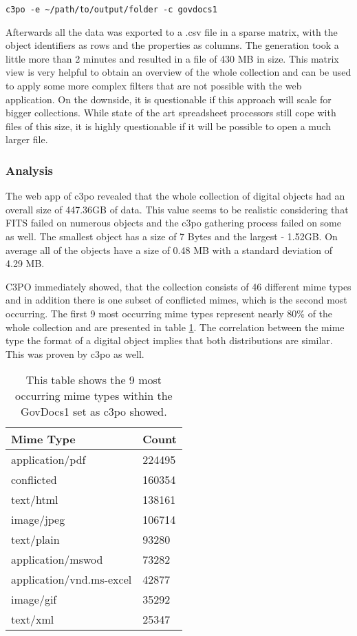 \begin{verbatim}
c3po -e ~/path/to/output/folder -c govdocs1
\end{verbatim}
Afterwards all the data was exported to a .csv file in a sparse matrix, with the object identifiers as rows and the properties as columns. The generation took a little more than 2 minutes and resulted in a file of 430 MB in size. This matrix view is very helpful to obtain an overview of the whole collection and can be used to apply some more complex filters that are not possible with the web application. On the downside, it is questionable if this approach will scale for bigger collections. While state of the art spreadsheet processors still cope with files of this size, it is highly questionable if it will be possible to open a much larger file.

\subsubsection{Analysis}
The web app of c3po revealed that the whole collection of digital objects had an overall size of 447.36GB of data. This value seems to be realistic considering that FITS failed on numerous objects and the c3po gathering process failed on some as well. The smallest object has a size of 7 Bytes and the largest - 1.52GB. On average all of the objects have a size of 0.48 MB with a standard deviation of 4.29 MB.

C3PO immediately showed, that the collection consists of 46 different mime types and in addition there is one subset of conflicted mimes, which is the second most occurring. The first 9 most occurring mime types represent nearly 80\% of the whole collection and are presented in table \ref{tab:govdocs1_mimetypes}. The correlation between the mime type the format of a digital object implies that both distributions are similar. This was proven by c3po as well.


\begin{table}[h]
\centering
\begin{tabular}{l || l }
\hline
Mime Type & Count \\
\hline
\hline
 application/pdf & 224495 \\
 conflicted 	& 160354 \\
 text/html		&  138161 \\
 image/jpeg	&  106714 \\
 text/plain		& 93280 \\
 application/mswod & 73282 \\
 application/vnd.ms-excel & 42877 \\
 image/gif		& 35292 \\
 text/xml		& 25347\\
 \hline
\end{tabular}
\caption{This table shows the 9 most occurring mime types within the GovDocs1 set as c3po showed.}
\label{tab:govdocs1_mimetypes}
\end{table}

